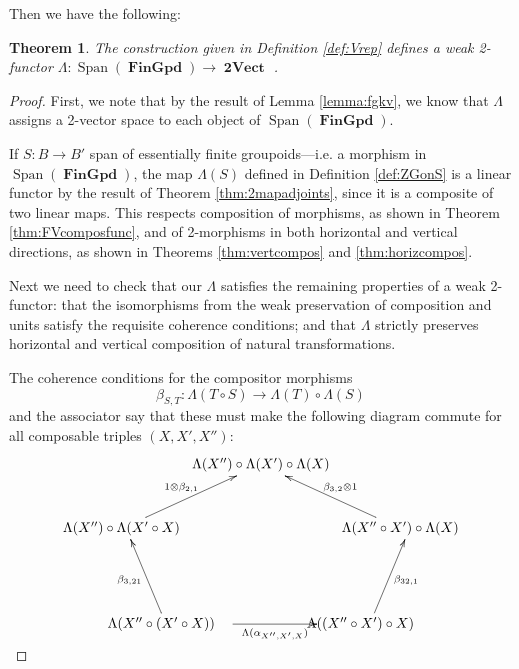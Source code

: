 \documentclass[10pt]{amsart}
\newtheorem{theorem}{Theorem}
\numberwithin{theorem}{subsection}
\newcommand{\ra}{\mathop{\rightarrow}}
\newcommand{\opname}[1]{\operatorname{#1}}
\newcommand{\catname}[1]{\boldsymbol{\opname{{#1}}}}
\newcommand{\Span}{\opname{Span}}
\newcommand{\iiV}{\catname{2Vect}}
\newcommand{\Gpd}{\catname{FinGpd}}
\newcommand{\FV}{\Lambda}
\begin{document}
Then we have the following:

\begin{theorem}\label{thm:mainthm} The construction given in Definition \ref{def:Vrep} defines a weak 2-functor $\FV : \Span(\Gpd) \ra \iiV$ .
\end{theorem}
\begin{proof}
First, we note that by the result of Lemma \ref{lemma:fgkv}, we know
that $\FV$ assigns a 2-vector space to each object of
$\Span(\Gpd)$.

If $S : B \ra B'$ span of essentially finite groupoids---i.e. a
morphism in $\Span(\Gpd)$, the map $\FV(S)$ defined in Definition
\ref{def:ZGonS} is a linear functor by the result of Theorem
\ref{thm:2mapadjoints}, since it is a composite of two linear maps.
This respects composition of morphisms, as shown in Theorem \ref{thm:FVcomposfunc}, and of 2-morphisms in both horizontal and vertical directions, as shown in Theorems \ref{thm:vertcompos} and \ref{thm:horizcompos}.

Next we need to check that our $\FV$ satisfies the remaining properties of a
weak 2-functor: that the isomorphisms from the weak preservation of
composition and units satisfy the requisite coherence conditions; and
that $\FV$ strictly preserves horizontal and vertical composition of
natural transformations.

The coherence conditions for the compositor morphisms
\begin{equation}
\beta_{S,T} :   \FV(T \circ S) \ra \FV(T) \circ \FV(S)
\end{equation}
and the associator say that these must make the following diagram
commute for all composable triples $(X,X',X'')$:
\begin{equation}\label{eq:wk2fncassoc}
\xy
 (0,20)*+{\FV(X'') \circ \FV(X') \circ \FV(X)}="top";
 (35,4)*+{\FV(X'' \circ X') \circ \FV(X)}="rttop";
 (25,-20)*+{\FV( (X'' \circ X') \circ X )}="rtbot";
 (-25,-20)*+{\FV(X'' \circ (X' \circ X) )}="leftbot";
 (-35,4)*+{\FV(X'') \circ \FV(X' \circ X)}="leftop";
     {\ar^{1 \otimes \beta_{2,1}} "leftop";"top"}
     {\ar_{\beta_{3,2} \otimes 1} "rttop";"top"}
     {\ar^{\beta_{3,21}} "leftbot";"leftop"}
     {\ar_{\beta_{32,1}} "rtbot";"rttop"}
     {\ar_{\FV(\alpha_{X'',X',X})} "leftbot";"rtbot"}
\endxy
\end{equation}


\end{proof}
\end{document}
